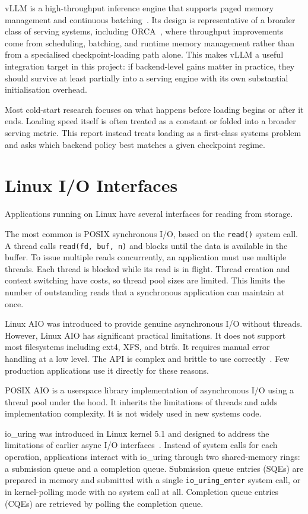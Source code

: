 vLLM is a high-throughput inference engine that supports paged memory management and continuous batching~\cite{pagedattention,vllm_repo}. Its design is representative of a broader class of serving systems, including ORCA~\cite{orca}, where throughput improvements come from scheduling, batching, and runtime memory management rather than from a specialised checkpoint-loading path alone. This makes vLLM a useful integration target in this project: if backend-level gains matter in practice, they should survive at least partially into a serving engine with its own substantial initialisation overhead.

Most cold-start research focuses on what happens before loading begins or after it ends. Loading speed itself is often treated as a constant or folded into a broader serving metric. This report instead treats loading as a first-class systems problem and asks which backend policy best matches a given checkpoint regime.

\section{Linux I/O Interfaces}

Applications running on Linux have several interfaces for reading from storage.

The most common is POSIX synchronous I/O, based on the \texttt{read()} system call. A thread calls \texttt{read(fd, buf, n)} and blocks until the data is available in the buffer. To issue multiple reads concurrently, an application must use multiple threads. Each thread is blocked while its read is in flight. Thread creation and context switching have costs, so thread pool sizes are limited. This limits the number of outstanding reads that a synchronous application can maintain at once.

Linux AIO was introduced to provide genuine asynchronous I/O without threads. However, Linux AIO has significant practical limitations. It does not support most filesystems including ext4, XFS, and btrfs. It requires manual error handling at a low level. The API is complex and brittle to use correctly~\cite{MAN7_AIO7}. Few production applications use it directly for these reasons.

POSIX AIO is a userspace library implementation of asynchronous I/O using a thread pool under the hood. It inherits the limitations of threads and adds implementation complexity. It is not widely used in new systems code.

io\_uring was introduced in Linux kernel 5.1 and designed to address the limitations of earlier async I/O interfaces~\cite{AXBOE_IOURING_PDF,MAN7_IOURING7}. Instead of system calls for each operation, applications interact with io\_uring through two shared-memory rings: a submission queue and a completion queue. Submission queue entries (SQEs) are prepared in memory and submitted with a single \texttt{io\_uring\_enter} system call, or in kernel-polling mode with no system call at all. Completion queue entries (CQEs) are retrieved by polling the completion queue.

